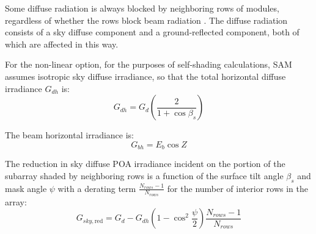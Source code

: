\documentclass[12pt,letterpaper]{article}
\begin{document}
Some diffuse radiation is always blocked by neighboring rows of modules, regardless of whether the rows block beam radiation \citep{goswami1989}. The diffuse radiation consists of a sky diffuse component and a ground-reflected component, both of which are affected in this way.

For the non-linear option, for the purposes of self-shading calculations, SAM assumes isotropic sky diffuse irradiance, so that the total horizontal diffuse irradiance $G_{dh}$ is:
\begin{equation}\label{eqn-selfshaddiffhor}
G_{dh} = G_d \left(\frac{2}{1+\cos\beta_s}\right)
\end{equation}

The beam horizontal irradiance is:
\begin{equation}
G_{bh} = E_b\cos Z 
\end{equation}



The reduction in sky diffuse POA irradiance incident on the portion of the subarray shaded by neighboring rows is a function of the surface tilt angle $\beta_s$ and mask angle $\psi$ with a derating term $\frac{N_{rows}-1}{N_{rows}}$ for the number of interior rows in the array:
\begin{equation}\label{eqn-selfshad-skydiff2}
G_{sky,\text{red}} = G_d - G_{dh}\left(1 - \cos^2\frac{\psi}{2}\right)\frac{N_{rows} - 1}{N_{rows}}
\end{equation}
\end{document}
